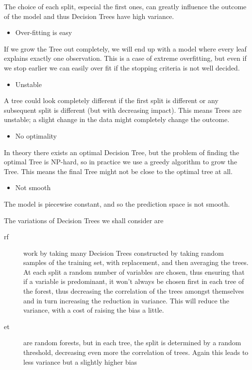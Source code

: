 The choice of each split, especial the first ones, can greatly influence the outcome of the model and thus Decision Trees have high variance.

\begin{itemize}
\item Over-fitting is easy
\end{itemize}
If we grow the Tree out completely, we will end up with a model where every leaf explains exactly one observation. This is a case of extreme overfitting, but even if we stop earlier we can easily over fit if the stopping criteria is not well decided.
\begin{itemize}
\item Unstable
\end{itemize}
A tree could look completely different if the first split is different or any subsequent split is different (but with decreasing impact). This means Trees are unstable; a slight change in the data might completely change the outcome.
\begin{itemize}
\item No optimality
\end{itemize}
In theory there exists an optimal Decision Tree, but the problem of finding the optimal Tree is NP-hard, so in practice we use a greedy algorithm to grow the Tree. This means the final Tree might not be close to the optimal tree at all.
\begin{itemize}
\item Not smooth
\end{itemize}
The model is piecewise constant, and so the prediction space is not smooth.


The variations of Decision Trees we shall consider are

\begin{description}
\item [\acrfull{rf}] work by taking many Decision Trees constructed by taking random samples of the training set, with replacement, and then averaging the trees. At each split a random number of variables are chosen, thus ensuring that if a variable is predominant, it won't always be chosen first in each tree of the forest, thus decreasing the correlation of the trees amongst themselves and in turn increasing the reduction in variance.
This will reduce the variance, with a cost of raising the bias a little.

\item [\acrfull{et}] are random forests, but in each tree, the split is determined by a random threshold, decreasing even more the correlation of trees. 
Again this leads to less variance but a slightly higher bias
\end{description}


